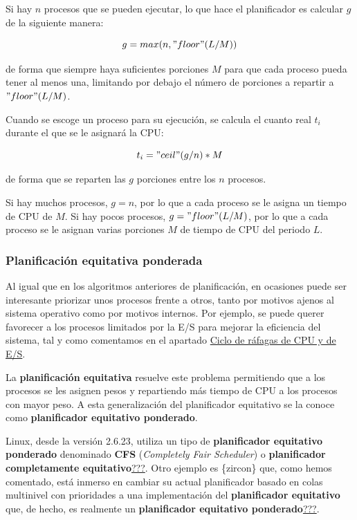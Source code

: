Si hay \(n\) procesos que se pueden ejecutar, lo que hace el
planificador es calcular \(g\) de la siguiente manera:

\[g = max(n, "floor"(L/M))\]

de forma que siempre haya suficientes porciones \(M\) para que cada
proceso pueda tener al menos una, limitando por debajo el número de
porciones a repartir a \("floor"(L / M)\).

Cuando se escoge un proceso para su ejecución, se calcula el cuanto real
\(t_i\) durante el que se le asignará la CPU:

\[t_i = "ceil"(g/n)*M\]

de forma que se reparten las \(g\) porciones entre los \(n\) procesos.

Si hay muchos procesos, \(g = n\), por lo que a cada proceso se le
asigna un tiempo de CPU de \(M\). Si hay pocos procesos,
\(g = "floor"(L / M)\), por lo que a cada proceso se le asignan varias
porciones \(M\) de tiempo de CPU del periodo \(L\).

\subsubsection{Planificación equitativa
ponderada}\label{_planificaciuxf3n_equitativa_ponderada}

{} Al igual que en los algoritmos anteriores de planificación, en
ocasiones puede ser interesante priorizar unos procesos frente a otros,
tanto por motivos ajenos al sistema operativo como por motivos internos.
Por ejemplo, se puede querer favorecer a los procesos limitados por la
E/S para mejorar la eficiencia del sistema, tal y como comentamos en el
apartado \hyperref[_ciclo_de_ruxe1fagas_de_cpu_y_de_es]{Ciclo de ráfagas
de CPU y de E/S}.

La \textbf{planificación equitativa} resuelve este problema permitiendo
que a los procesos se les asignen pesos y repartiendo más tiempo de CPU
a los procesos con mayor peso. A esta generalización del planificador
equitativo se la conoce como \textbf{planificador equitativo ponderado}.

Linux, desde la versión 2.6.23, utiliza un tipo de \textbf{planificador
equitativo ponderado} denominado \textbf{{}CFS} (\emph{Completely Fair
Scheduler}) o \textbf{planificador completamente
equitativo}{}\hyperref[Jones2018]{???}. Otro ejemplo es \{zircon\} que,
como hemos comentado, está inmerso en cambiar su actual planificador
basado en colas multinivel con prioridades a una implementación del
\textbf{planificador equitativo} que, de hecho, es realmente un
\textbf{planificador equitativo
ponderado}\hyperref[Fuchsia-ZirconFairScheduler]{???}.

